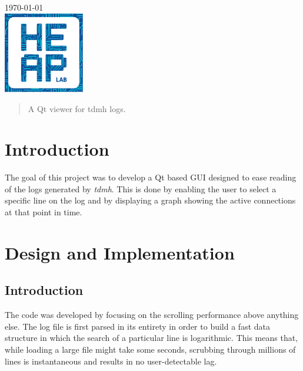 \begin{titlepage}

{\large \today}\\[2cm] %


\includegraphics[width=100pt]{heaplogo.pdf}\\[1cm] %
 

\vfill %

\end{titlepage}




\begin{abstract}
A Qt viewer for tdmh logs.
\end{abstract}

\section{Introduction}

The goal of this project was to develop a Qt based GUI designed to ease reading of the logs generated by \textit{tdmh}. This is done by enabling the user to select a specific line on the log and by displaying a graph showing the active connections at that point in time.

\section{Design and Implementation}

\subsection{Introduction}
The code was developed by focusing on the scrolling performance above anything else. The log file is first parsed in its entirety in order to build a fast data structure in which the search of a particular line is logarithmic. This means that, while loading a large file might take some seconds, scrubbing through millions of lines is instantaneous and results in no user-detectable lag.

